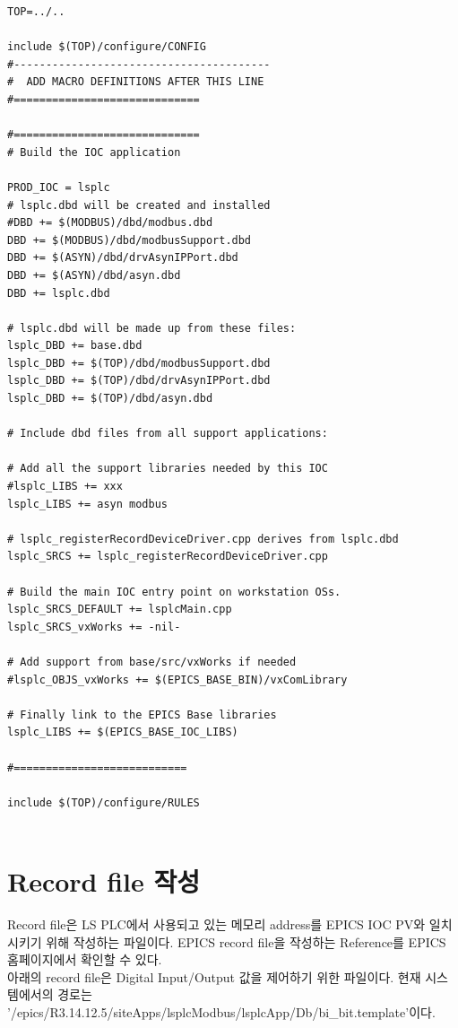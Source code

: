 \documentclass[11pt
  , a4paper
  , article
  , oneside
]{memoir}
\begin{document}
\begin{lstlisting}[style=termstyle]
TOP=../..

include $(TOP)/configure/CONFIG
#----------------------------------------
#  ADD MACRO DEFINITIONS AFTER THIS LINE
#=============================

#=============================
# Build the IOC application

PROD_IOC = lsplc
# lsplc.dbd will be created and installed
#DBD += $(MODBUS)/dbd/modbus.dbd
DBD += $(MODBUS)/dbd/modbusSupport.dbd
DBD += $(ASYN)/dbd/drvAsynIPPort.dbd
DBD += $(ASYN)/dbd/asyn.dbd
DBD += lsplc.dbd

# lsplc.dbd will be made up from these files:
lsplc_DBD += base.dbd
lsplc_DBD += $(TOP)/dbd/modbusSupport.dbd
lsplc_DBD += $(TOP)/dbd/drvAsynIPPort.dbd
lsplc_DBD += $(TOP)/dbd/asyn.dbd

# Include dbd files from all support applications:

# Add all the support libraries needed by this IOC
#lsplc_LIBS += xxx
lsplc_LIBS += asyn modbus

# lsplc_registerRecordDeviceDriver.cpp derives from lsplc.dbd
lsplc_SRCS += lsplc_registerRecordDeviceDriver.cpp

# Build the main IOC entry point on workstation OSs.
lsplc_SRCS_DEFAULT += lsplcMain.cpp
lsplc_SRCS_vxWorks += -nil-

# Add support from base/src/vxWorks if needed
#lsplc_OBJS_vxWorks += $(EPICS_BASE_BIN)/vxComLibrary

# Finally link to the EPICS Base libraries
lsplc_LIBS += $(EPICS_BASE_IOC_LIBS)

#===========================

include $(TOP)/configure/RULES


\end{lstlisting}


\section{Record file 작성}

Record file은 LS PLC에서 사용되고 있는 메모리 address를 EPICS IOC PV와 일치시키기 위해 작성하는 파일이다. EPICS record file을 작성하는 Reference를 EPICS 홈페이지에서 확인할 수 있다.\\

아래의 record file은 Digital Input/Output 값을 제어하기 위한 파일이다. 현재 시스템에서의 경로는 '/epics/R3.14.12.5/siteApps/lsplcModbus/lsplcApp/Db/bi\_bit.template'이다. \\
\end{document}
